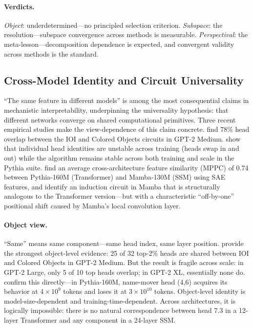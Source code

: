\documentclass{article}
\begin{document}
\paragraph{Verdicts.}
\emph{Object}: underdetermined---no principled selection criterion.
\emph{Subspace}: the resolution---subspace convergence across methods is
measurable.
\emph{Perspectival}: the meta-lesson---decomposition dependence is
expected, and convergent validity across methods is the standard.


\subsection{Cross-Model Identity and Circuit Universality}\label{app:cs_cross}

``The same feature in different models'' is among the most consequential
claims in mechanistic interpretability, underpinning the universality
hypothesis: that different networks converge on shared computational
primitives. Three recent empirical studies make the view-dependence of
this claim concrete. \citet{merullo2024} find 78\% head overlap between
the IOI and Colored Objects circuits in GPT-2 Medium.
\citet{tigges2024} show that individual head identities are unstable
across training (heads swap in and out) while the algorithm remains
stable across both training and scale in the Pythia suite.
\citet{wang2024universality} find an average cross-architecture feature
similarity (MPPC) of 0.74 between Pythia-160M (Transformer) and
Mamba-130M (SSM) using SAE features, and identify an induction circuit
in Mamba that is structurally analogous to the Transformer version---but
with a characteristic ``off-by-one'' positional shift caused by Mamba's
local convolution layer.

\paragraph{Object view.}
``Same'' means same component---same head index, same layer position.
\citet{merullo2024} provide the strongest object-level evidence: 25 of
32 top-2\% heads are shared between IOI and Colored Objects in GPT-2
Medium. But the result is fragile across scale: in GPT-2 Large, only 5
of 10 top heads overlap; in GPT-2 XL, essentially none do.
\citet{tigges2024} confirm this directly---in Pythia-160M, name-mover
head (4,6) acquires its behavior at $4 \times 10^9$ tokens and loses it
at $3 \times 10^{10}$ tokens. Object-level identity is
model-size-dependent and training-time-dependent. Across architectures,
it is logically impossible: there is no natural correspondence between
head 7.3 in a 12-layer Transformer and any component in a 24-layer SSM.
\end{document}
